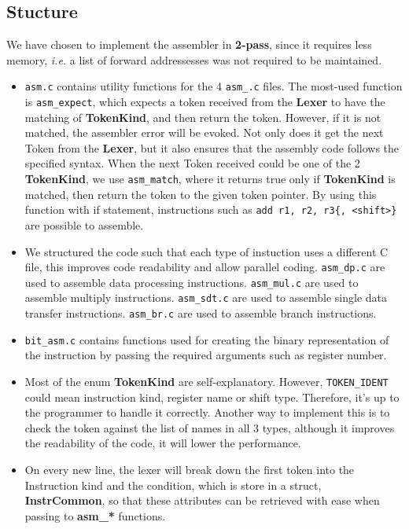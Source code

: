 \documentclass[11pt, a4paper]{article}
\begin{document}
\subsection{Stucture}
We have chosen to implement the assembler in \textbf{2-pass}, since it requires less memory, \textit{i.e.} a list of forward addressesses was not required to be maintained.
\begin{itemize}
  \setlength\itemsep{0em}
  \item \texttt{asm.c} contains utility functions for the 4 \texttt{asm\_\*.c} files. The most-used function is \texttt{asm\_expect}, which expects a token received from the \textbf{Lexer} to have the matching of \textbf{TokenKind}, and then return the token. However, if it is not matched, the assembler error will be evoked. Not only does it get the next Token from the \textbf{Lexer}, but it also ensures that the assembly code follows the specified syntax. When the next Token received could be one of the 2 \textbf{TokenKind}, we use \texttt{asm\_match}, where it returns true only if \textbf{TokenKind} is matched, then return the token to the given token pointer. By using this function with if statement, instructions such as \verb|add r1, r2, r3{, <shift>}| are possible to assemble.
  \item  We structured the code such that each type of instuction uses a different C file, this improves code readability and allow parallel coding. \texttt{asm\_dp.c} are used to assemble data processing instructions. \texttt{asm\_mul.c} are used to assemble multiply instructions. \texttt{asm\_sdt.c} are used to assemble single data transfer instructions. \texttt{asm\_br.c} are used to assemble branch instructions.
  \item \texttt{bit\_asm.c} contains functions used for creating the binary representation of the instruction by passing the required arguments such as register number.
  \item  Most of the enum \textbf{TokenKind} are self-explanatory. However, \texttt{TOKEN\_IDENT} could mean instruction kind, register name or shift type. Therefore, it's up to the programmer to handle it correctly. Another way to implement this is to check the token against the list of names in all 3 types, although it improves the readability of the code, it will lower the performance.
  \item  On every new line, the lexer will break down the first token into the Instruction kind and the condition, which is store in a struct, \textbf{InstrCommon}, so that these attributes can be retrieved with ease when passing to \textbf{asm\_*} functions. 
\end{itemize}
\end{document}
